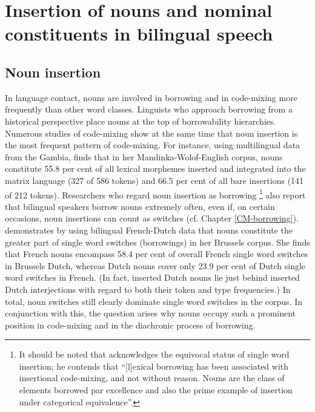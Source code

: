 \section{Insertion of nouns and nominal constituents in bilingual speech}
\subsection{Noun insertion}\label{noun-insertion}
In language contact, nouns are involved in borrowing and in code-mixing more frequently than other word classes. Linguists who approach borrowing from a historical perspective \citep{whitney-1881, moravcsik, thomason-kaufman, matras2009} place nouns at the top of borrowability hierarchies. Numerous studies of code-mixing show at the same time that noun insertion is the most frequent pattern of code-mixing. For instance, using multilingual data from the Gambia, \citet[112, 107]{haust-codeswitching-1995} finds that in her Mandinka-Wolof-English corpus, nouns constitute 55.8 per cent of all lexical morphemes inserted and integrated into the matrix language (327 of 586 tokens) and 66.5 per cent of all bare insertions (141 of 212 tokens). Researchers who regard noun insertion as borrowing \citep{poplack-etal-1988, sankoff-et-al-1990, van-hout-muysken, muysken-bilingual-2000}\footnote{It should be noted that \citet[][75]{muysken-bilingual-2000} acknowledges the equivocal status of single word insertion; he contends that ``[l]exical borrowing has been associated with insertional code-mixing, and not without reason. Nouns are the class of elements borrowed par excellence and also the prime example of insertion under categorical equivalence''.} 
also report that bilingual speakers borrow nouns extremely often, even if, on certain occasions, noun insertions can count as switches (cf. Chapter \ref{CM-borrowing}). \citet[99--100]{treffers-daller-mixing-1994} demonstrates by using bilingual French-Dutch data that nouns constitute the greater part of single word switches (borrowings) in her Brussels corpus. She finds that French nouns encompass 58.4 per cent of overall French single word switches in Brussels Dutch, whereas Dutch nouns cover only 23.9 per cent of Dutch single word switches in French. (In fact, inserted Dutch nouns lie just behind inserted Dutch interjections with regard to both their token and type frequencies.) In total, noun switches still clearly dominate single word switches in the corpus. In conjunction with this, the question arises why nouns occupy such a prominent position in code-mixing and in the diachronic process of borrowing. 

